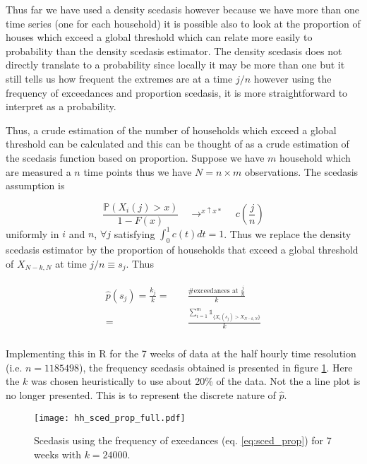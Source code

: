 Thus far we have used a density scedasis however because we have more than one time series (one for each household) it is possible also to look at the proportion of houses which exceed a global threshold which can relate more easily to probability than the density scedasis estimator. The density scedasis does not directly translate to a probability since locally it may be more than one but it still tells us how frequent the extremes are at a time $j/n$ however using the frequency of exceedances and proportion scedasis, it is more straightforward to interpret as a probability.

Thus, a crude estimation of the number of households which exceed a global threshold can be calculated and this can be thought of as a crude estimation of the scedasis function based on proportion. Suppose we have $m$ household which are measured a $n$ time points thus we have $N= n \times m$ observations. The scedasis assumption is

\begin{equation*}
\frac{\mathbb{P}(X_i(j)>x)}{1-F(x)} \quad  \displaystyle{ \mathop{\rightarrow}^{x \uparrow x*}} \quad c\left(\frac{j}{n}\right)
\end{equation*}
\noindent uniformly in $i$ and $n$, $\forall j$ satisfying $\int_0^1 c(t)dt = 1$. Thus we replace the density scedasis estimator by the proportion of households that exceed a global threshold of $X_{N-k,N}$ at time $j/n \equiv s_j$. Thus

\begin{align} \label{eq:sced_prop}
\begin{split}
\hat{p}(s_j) =  \frac{k_j}{k} =& \quad \frac{\# \text{exceedances at } \frac{j}{n}}{k} \\
= & \quad \frac{\sum_{i=1}^m \mathbb{1}_{\{X_i(s_j) > X_{N-k,N}\}}}{k}\\
\end{split}
\end{align}

Implementing this in R for the 7 weeks of data at the half hourly time resolution (i.e. $n = 1185498$), the frequency scedasis obtained is presented in figure \ref{fig:hh_sced_prop}. Here the $k$ was chosen heuristically to use about 20\% of the data. Not the a line plot is no longer presented. This is to represent the discrete nature of $\hat{p}$.

\begin{figure}
\centering
\texttt{[image: hh\_sced\_prop\_full.pdf]}
\caption{\label{fig:hh_sced_prop} Scedasis using the frequency of exeedances (eq. \ref{eq:sced_prop}) for 7 weeks with $k=24000$.}
\end{figure}

